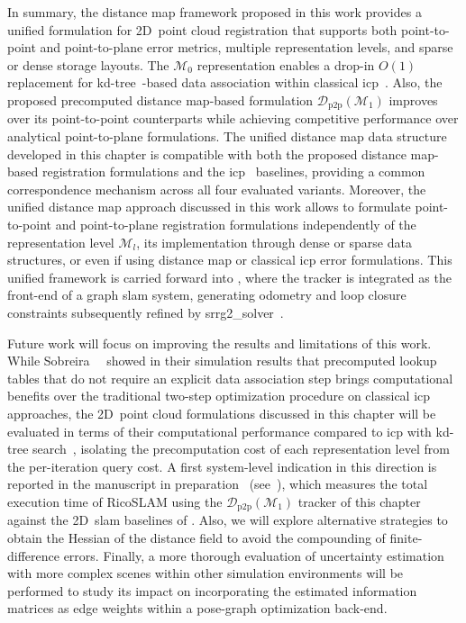 In summary, the distance map framework proposed in this work provides
a unified formulation for 2D~point cloud registration that supports both
point-to-point and point-to-plane error metrics,
multiple representation levels, and sparse or dense storage layouts.
The $\mathcal{M}_0$ representation enables a drop-in $O(1)$ replacement for
kd-tree~\cite{bentley:cacm:1975}-based data association within
classical \gls{icp}~\cite{besl-mckay:tpami:1992,chen-medioni:icra:1991}.
Also, the proposed precomputed distance map-based formulation
$\mathcal{D}_\mathrm{p2p}(\mathcal{M}_1)$ improves over its point-to-point
counterparts while achieving competitive performance over analytical
point-to-plane formulations.
The unified distance map data structure developed in this chapter is compatible
with both the proposed distance map-based registration formulations and the
\gls{icp}~\cite{besl-mckay:tpami:1992,chen-medioni:icra:1991} baselines,
providing a common correspondence mechanism across all four evaluated variants.
Moreover, the unified distance map approach discussed in this work allows
to formulate point-to-point and point-to-plane registration formulations
independently of the representation level $\mathcal{M}_l$,
its implementation through dense or sparse data structures, or even if using
distance map or classical \gls{icp} error formulations.
This unified framework is carried forward into , where
the tracker is integrated as the front-end of a graph \gls{slam} system,
generating odometry and loop closure constraints subsequently
refined by srrg2\_solver~\cite{grisetti:robotics:2020}.

Future work will focus on improving the results and limitations of this work.
While Sobreira~\etal~\cite{sobreira:jint:2019} showed in their simulation
results that precomputed lookup tables that do not require
an explicit data association step brings computational benefits over
the traditional two-step optimization procedure on classical
\gls{icp}~\cite{besl-mckay:tpami:1992,chen-medioni:icra:1991} approaches,
the 2D~point cloud formulations discussed in this chapter will be evaluated
in terms of their computational performance compared to
\gls{icp} with kd-tree search~\cite{bentley:cacm:1975}, isolating the
precomputation cost of each representation level from the per-iteration
query cost. A first system-level indication in this direction is reported in
the manuscript in preparation~\cite{sousa:ral:2026}
(see~), which measures the total execution time of
RicoSLAM using the $\mathcal{D}_\mathrm{p2p}(\mathcal{M}_1)$ tracker of this
chapter against the 2D~\gls{slam} baselines of .
Also, we will explore alternative strategies to obtain the Hessian of the
distance field to avoid the compounding of finite-difference errors.
Finally, a more thorough evaluation of uncertainty estimation with more complex
scenes within other simulation environments will be performed to study its
impact on incorporating the estimated information matrices as edge weights
within a pose-graph optimization back-end.
